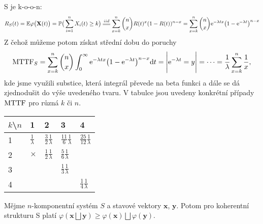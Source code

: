 \begin{example}
S je k-o-o-n: 
$$ R_S(t)=\E\varphi\big(\textbf{X}(t)\big)= \PP\big(\sum_{i=1}^n X_i(t)\geq k\big)\equal{iid}\sum_{x=k}^n {n\choose x} R(t)^{x} (1-R(t))^{n-x} = \sum_{x=k}^n {n\choose x} \e{-\lambda tx} \big(1-\e{-\lambda t}\big)^{n-x}   $$
Z čehož můžeme potom získat střední dobu do poruchy
$$\mathrm{MTTF}_S = \sum_{x=k}^n {n\choose x} \int_0^\infty \mathrm{e}^{-\lambda tx} \big(1-\mathrm{e}^{-\lambda t}\big)^{n-x} \mathrm{d} t = \Bigg| \mathrm{e}^{-\lambda t} = y \Bigg| = \dots =  \frac{1}{\lambda} \sum_{x=k}^n \frac{1}{x},$$
kde jsme využili substice, která integrál převede na beta funkci a dále se dá zjednodušit do výše uvedeného tvaru. V tabulce jsou uvedeny konkrétní případy $\mathrm{MTTF}$ pro různá $k$ či $n$.

\begin{table}[h]
	\centering
	\begin{tabular}{|l|l|l|l|l|}
		\hline
		$k$\textbackslash $n$& 1 & 2 &3  & 4 \\ \hline\hline
		1&$\frac{1}{\lambda}$  &  $\frac{3}{2}$$\frac{1}{\lambda}$& $\frac{11}{6}$$\frac{1}{\lambda}$ & $\frac{25}{12}$$\frac{1}{\lambda}$ \\ \hline
		2& $\times$ & $\frac{1}{2}$$\frac{1}{\lambda}$ & $\frac{5}{6}$$\frac{1}{\lambda}$ &  \\ \hline
		3&  &  & $\frac{1}{3}$$\frac{1}{\lambda}$ &  \\ \hline
		4&  &  &  & $\frac{1}{4}$$\frac{1}{\lambda}$ \\ \hline
	\end{tabular}
\end{table}
\end{example}

\begin{theorem}
	Mějme $n$-komponentní systém $S$ a stavové vektory $\textbf{x}$, $\textbf{y}$. Potom pro koherentní strukturu S platí $\varphi(\textbf{x} \bigsqcup \textbf{y}) \geq  \varphi(\textbf{x}) \bigsqcup \varphi(\textbf{y})$.
\end{theorem}


